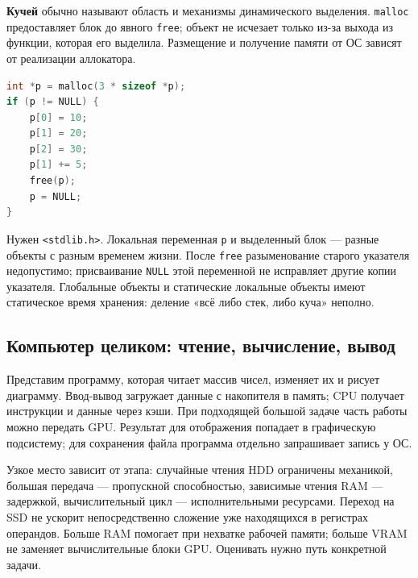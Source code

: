 \textbf{Кучей} обычно называют область и механизмы динамического выделения.
\texttt{malloc} предоставляет блок до явного \texttt{free}; объект не исчезает
только из-за выхода из функции, которая его выделила. Размещение и получение
памяти от ОС зависят от реализации аллокатора.
\begin{lstlisting}[language=C,basicstyle=\ttfamily\small]
int *p = malloc(3 * sizeof *p);
if (p != NULL) {
    p[0] = 10;
    p[1] = 20;
    p[2] = 30;
    p[1] += 5;
    free(p);
    p = NULL;
}
\end{lstlisting}
Нужен \texttt{<stdlib.h>}. Локальная переменная \texttt{p} и выделенный
блок --- разные объекты с разным временем жизни. После \texttt{free}
разыменование старого указателя недопустимо; присваивание \texttt{NULL}
этой переменной не исправляет другие копии указателя.
Глобальные объекты и статические локальные объекты имеют статическое время
хранения: деление «всё либо стек, либо куча» неполно.

\subsection{Компьютер целиком: чтение, вычисление, вывод}
Представим программу, которая читает массив чисел, изменяет их и рисует
диаграмму. Ввод-вывод загружает данные с накопителя в память; CPU получает
инструкции и данные через кэши. При подходящей большой задаче часть работы
можно передать GPU. Результат для отображения попадает в графическую
подсистему; для сохранения файла программа отдельно запрашивает запись у ОС.

Узкое место зависит от этапа: случайные чтения HDD ограничены механикой,
большая передача --- пропускной способностью, зависимые чтения RAM ---
задержкой, вычислительный цикл --- исполнительными ресурсами. Переход на SSD
не ускорит непосредственно сложение уже находящихся в регистрах операндов.
Больше RAM помогает при нехватке рабочей памяти; больше VRAM не заменяет
вычислительные блоки GPU. Оценивать нужно путь конкретной задачи.

